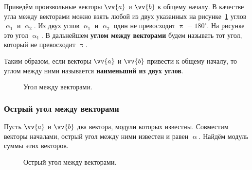 Приведём произвольные векторы $\vv{a}$ и $\vv{b}$ к общему началу.
В качестве угла между векторами можно взять любой из двух указанных
на рисунке~\ref{pic:vec_ugol} углов $\upalpha_1$ и $\upalpha_2$.
Из двух углов $\upalpha_1$ и $\upalpha_2$ один не превосходит $\uppi = 180^\circ$.
На рисунке это угол $\upalpha_1$.
В дальнейшем \textbf{углом между векторами} будем называть тот угол, который не превосходит $\uppi$.


Таким образом, если векторы $\vv{a}$ и $\vv{b}$ привести к общему началу, то
углом между ними называется \textbf{наименьший из двух углов}.
\begin{figure}[h]
  \centering
  \caption{\small Угол между векторами.}\label{pic:vec_ugol}
\end{figure}

\clearpage

\subsubsection{Острый угол между векторами}
Пусть $\vv{a}$ и $\vv{b}$ \bdash два вектора, модули которых известны.
Совместим векторы началами, острый угол между ними известен и равен $\upalpha$.
Найдём модуль суммы этих векторов.

\begin{figure}[h]
  \centering
  \caption{\small Острый угол между векторами.}\label{pic:sum_ugol1}
\end{figure}

